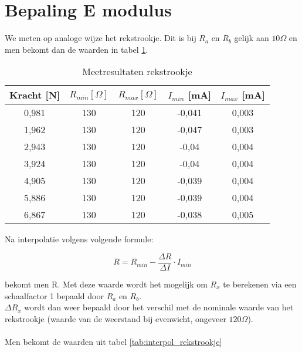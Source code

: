 \section{Bepaling E modulus}

We meten op analoge wijze het rekstrookje.
Dit is bij $R_a$ en $R_b$ gelijk aan $10\Omega$ en 
men bekomt dan de waarden in tabel \ref{tab:rekstrookje}.

\begin{table}[h]
    \centering
    \caption{Meetresultaten rekstrookje}
    \label{tab:rekstrookje}

    \begin{tabular}{| c | c | c | c | c |}
        \hline
        Kracht [N] & $R_{min} [\Omega]$& $R_{max} [\Omega]$& $I_{min}$ [mA] & $I_{max}$ [mA] \\ \hline
        0,981      & 130               & 120               & -0,041    & 0,003 \\ \hline
        1,962      & 130               & 120               &-0,047     & 0,003 \\ \hline
        2,943      & 130               & 120               &-0,04      & 0,004 \\ \hline
        3,924      & 130               & 120               &-0,04      & 0,004 \\ \hline
        4,905      & 130               & 120               &-0,039     & 0,004 \\ \hline
        5,886      & 130               & 120               &-0,039     & 0,004 \\ \hline
        6,867      & 130               & 120               &-0,038     & 0,005 \\ \hline
    \end{tabular}
\end{table}

Na interpolatie volgens volgende formule:

\begin{equation}
    R = R_{min} - \frac{\Delta R}{\Delta I} \cdot I_{min}
\end{equation}


bekomt men R. Met deze waarde wordt het mogelijk om $R_{x}$ te
berekenen via een schaalfactor 1 bepaald door $R_{a}$ en $R_{b}$.
\\

$\Delta R_{x}$ wordt dan weer bepaald door het verschil met de
nominale waarde van het rekstrookje (waarde van de weerstand
bij evenwicht, ongeveer $120\Omega$).
\\ \\
Men bekomt de waarden uit tabel \ref{tab:interpol_rekstrookje}

